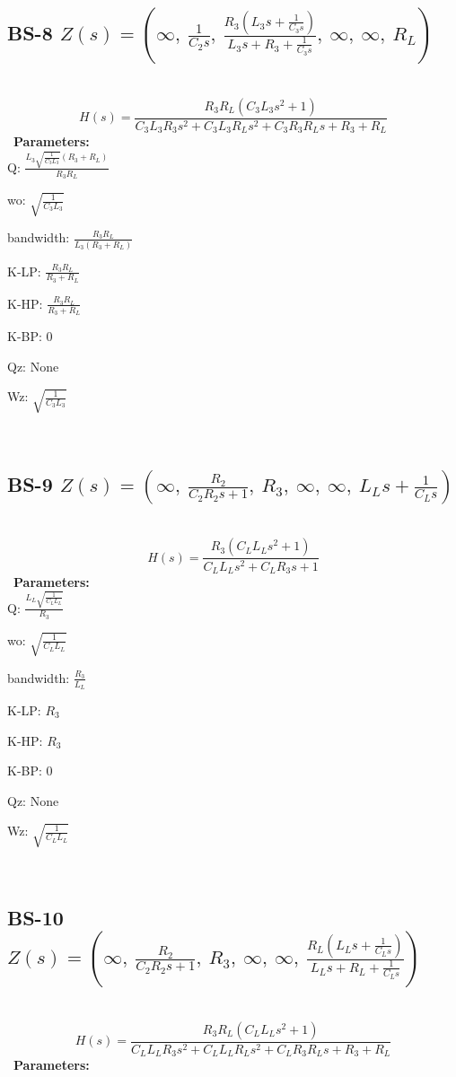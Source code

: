 \documentclass{article}
\begin{document}
\ 

\subsection{BS-8 $Z(s) = \left( \infty, \  \frac{1}{C_{2} s}, \  \frac{R_{3} \left(L_{3} s + \frac{1}{C_{3} s}\right)}{L_{3} s + R_{3} + \frac{1}{C_{3} s}}, \  \infty, \  \infty, \  R_{L}\right)$ } \ 
\textbf{\[H(s) = \frac{R_{3} R_{L} \left(C_{3} L_{3} s^{2} + 1\right)}{C_{3} L_{3} R_{3} s^{2} + C_{3} L_{3} R_{L} s^{2} + C_{3} R_{3} R_{L} s + R_{3} + R_{L}}\] } \ 
\textbf{Parameters:}\\ 

Q: $\frac{L_{3} \sqrt{\frac{1}{C_{3} L_{3}}} \left(R_{3} + R_{L}\right)}{R_{3} R_{L}}$\ 

wo: $\sqrt{\frac{1}{C_{3} L_{3}}}$\ 

bandwidth: $\frac{R_{3} R_{L}}{L_{3} \left(R_{3} + R_{L}\right)}$\ 

K-LP: $\frac{R_{3} R_{L}}{R_{3} + R_{L}}$\ 

K-HP: $\frac{R_{3} R_{L}}{R_{3} + R_{L}}$\ 

K-BP: $0$\ 

Qz: $\text{None}$\ 

Wz: $\sqrt{\frac{1}{C_{3} L_{3}}}$\ 

\ 

\subsection{BS-9 $Z(s) = \left( \infty, \  \frac{R_{2}}{C_{2} R_{2} s + 1}, \  R_{3}, \  \infty, \  \infty, \  L_{L} s + \frac{1}{C_{L} s}\right)$ } \ 
\textbf{\[H(s) = \frac{R_{3} \left(C_{L} L_{L} s^{2} + 1\right)}{C_{L} L_{L} s^{2} + C_{L} R_{3} s + 1}\] } \ 
\textbf{Parameters:}\\ 

Q: $\frac{L_{L} \sqrt{\frac{1}{C_{L} L_{L}}}}{R_{3}}$\ 

wo: $\sqrt{\frac{1}{C_{L} L_{L}}}$\ 

bandwidth: $\frac{R_{3}}{L_{L}}$\ 

K-LP: $R_{3}$\ 

K-HP: $R_{3}$\ 

K-BP: $0$\ 

Qz: $\text{None}$\ 

Wz: $\sqrt{\frac{1}{C_{L} L_{L}}}$\ 

\ 

\subsection{BS-10 $Z(s) = \left( \infty, \  \frac{R_{2}}{C_{2} R_{2} s + 1}, \  R_{3}, \  \infty, \  \infty, \  \frac{R_{L} \left(L_{L} s + \frac{1}{C_{L} s}\right)}{L_{L} s + R_{L} + \frac{1}{C_{L} s}}\right)$ } \ 
\textbf{\[H(s) = \frac{R_{3} R_{L} \left(C_{L} L_{L} s^{2} + 1\right)}{C_{L} L_{L} R_{3} s^{2} + C_{L} L_{L} R_{L} s^{2} + C_{L} R_{3} R_{L} s + R_{3} + R_{L}}\] } \ 
\textbf{Parameters:}\\ 
\end{document}
